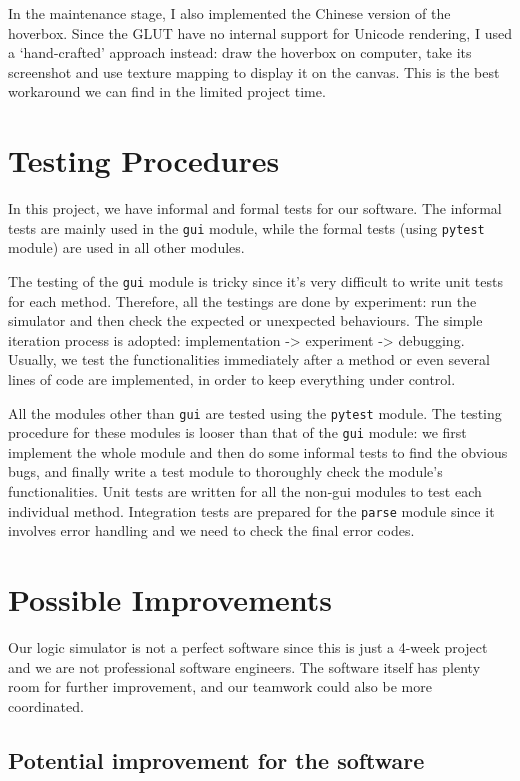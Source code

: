 \documentclass[10pt,a4paper]{article}
\begin{document}
In the maintenance stage, I also implemented the Chinese version of
the hoverbox. Since the GLUT have no internal support for Unicode
rendering, I used a `hand-crafted' approach instead: draw the hoverbox
on computer, take its screenshot and use texture mapping to display it
on the canvas. This is the best workaround we can find in the limited
project time.

\section{Testing Procedures}
\label{sec:org6edfe74}

In this project, we have informal and formal tests for our software.
The informal tests are mainly used in the \texttt{gui} module, while the
formal tests (using \texttt{pytest} module) are used in all other modules.

The testing of the \texttt{gui} module is tricky since it's very difficult to
write unit tests for each method. Therefore, all the testings are done
by experiment: run the simulator and then check the expected or
unexpected behaviours. The simple iteration process is adopted:
implementation -> experiment -> debugging. Usually, we test the
functionalities immediately after a method or even several lines of
code are implemented, in order to keep everything under control.

All the modules other than \texttt{gui} are tested using the \texttt{pytest} module.
The testing procedure for these modules is looser than that of the
\texttt{gui} module: we first implement the whole module and then do some
informal tests to find the obvious bugs, and finally write a test
module to thoroughly check the module's functionalities. Unit tests
are written for all the non-gui modules to test each individual
method. Integration tests are prepared for the \texttt{parse} module since it
involves error handling and we need to check the final error codes.

\section{Possible Improvements}
\label{sec:orga473cd2}

Our logic simulator is not a perfect software since this is just a
4-week project and we are not professional software engineers. The
software itself has plenty room for further improvement, and our
teamwork could also be more coordinated.

\subsection{Potential improvement for the software}
\label{sec:org4dfef29}
\end{document}
